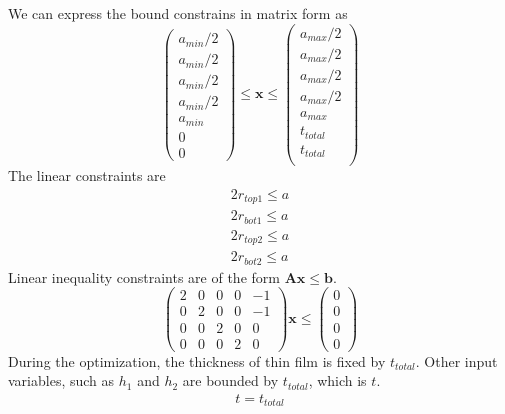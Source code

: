 \documentclass[12pt]{article}
\numberwithin{equation}{section}
\numberwithin{equation}{section}
\begin{document}
\begin{outline}[enumerate]
We can express the bound constrains in matrix form as
\begin{equation}
\left(
\begin{matrix}
a_{min}/2\\ 
a_{min}/2\\ 
a_{min}/2\\ 
a_{min}/2\\
a_{min}\\ 
0 \\
0 
\end{matrix} \right )
\leq \mathbf{x}
 \leq 
 \left(
\begin{matrix}
a_{max}/2 \\ a_{max}/2 \\ a_{max}/2 \\ a_{max}/2 \\ a_{max} \\ t_{total}\\  t_{total}\\
\end{matrix} \right )
\end{equation}
The linear constraints are 
\begin{align*} 
2 r_{top1} \leq a \\
2 r_{bot1} \leq a\\
2 r_{top2} \leq a\\
2 r_{bot2} \leq a 
\end{align*}
Linear inequality constraints are of the form $\mathbf{A} \mathbf{x} \leq \mathbf{b}$.
\setcounter{MaxMatrixCols}{20}
\begin{equation}
\left(
\begin{matrix}
2 & 0 & 0 & 0 & -1   \\
0 & 2 & 0 & 0 & -1  \\
0 & 0 & 2 & 0 & 0  \\
0 & 0 & 0 & 2 & 0  
\end{matrix}
\right ) \mathbf{x}  \leq \left ( \begin{matrix} 0\\ 0\\ 0\\ 0 \end{matrix} \right ) 
\end{equation}
During the optimization, the thickness of thin film is fixed by $t_{total}$. Other input variables, such as $h_1$ and $h_2$ are bounded by $t_{total}$, which is $t$.  
\begin{align}
t=t_{total}

\end{align}
\end{outline}
\end{document}
